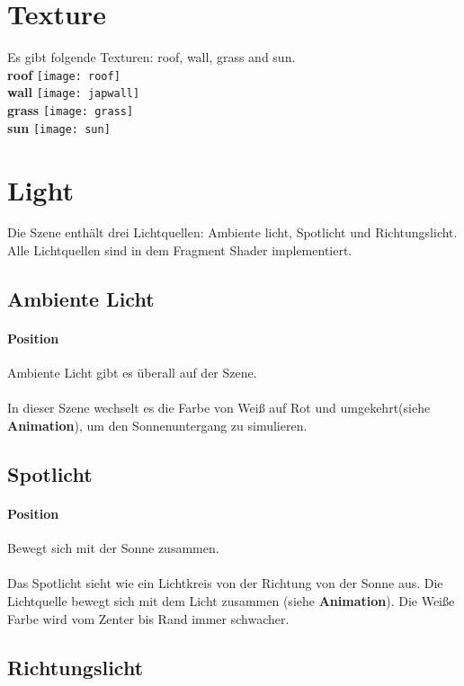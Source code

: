 \documentclass[12pt]{article}
\begin{document}
\pagebreak

\section{Texture}
Es gibt folgende Texturen: roof, wall, grass and sun. \\
\textbf{roof} \newline
\texttt{[image: roof]} \\
\textbf{wall} \newline
\texttt{[image: japwall]} \\
\textbf{grass} \newline
\texttt{[image: grass]} \\
\textbf{sun} \newline
\texttt{[image: sun]}

\pagebreak
\section{Light}
Die Szene enthält drei Lichtquellen: Ambiente licht, Spotlicht und Richtungslicht.
Alle Lichtquellen sind in dem Fragment Shader implementiert.
\subsection{Ambiente Licht}
\paragraph{Position} Ambiente Licht gibt es überall auf der Szene. \\\\
In dieser Szene wechselt es die Farbe von Weiß auf Rot und umgekehrt(siehe \textbf{Animation}), um den Sonnenuntergang zu simulieren.
\subsection{Spotlicht}
\paragraph{Position} Bewegt sich mit der Sonne zusammen.\\\\ 
Das Spotlicht sieht wie ein Lichtkreis von der Richtung von der Sonne aus. Die Lichtquelle bewegt sich mit dem Licht zusammen (siehe \textbf{Animation}).
Die Weiße Farbe wird vom Zenter bis Rand immer schwacher. 
\subsection{Richtungslicht}
\end{document}
